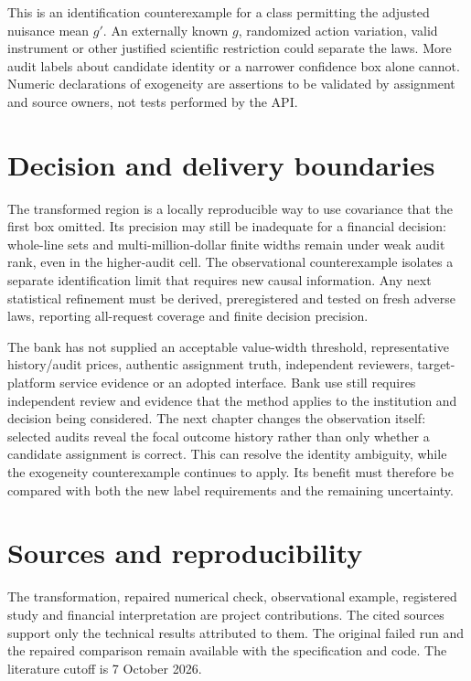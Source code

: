 This is an identification counterexample for a class permitting the adjusted
nuisance mean $g'$. An externally known $g$, randomized action variation,
valid instrument or other justified scientific restriction could separate
the laws. More audit labels about candidate identity or a narrower confidence
box alone cannot. Numeric declarations of exogeneity are assertions to be
validated by assignment and source owners, not tests performed by the API.

\section{Decision and delivery boundaries}

The transformed region is a locally reproducible way to use covariance that
the first box omitted. Its precision may still be inadequate for a financial decision: whole-line
sets and multi-million-dollar finite widths remain under weak audit rank,
even in the higher-audit cell. The observational counterexample isolates a separate identification limit that requires new causal information. Any next
statistical refinement must be derived, preregistered and tested on fresh
adverse laws, reporting all-request coverage and finite decision precision.

The bank has not supplied an acceptable value-width threshold, representative
history/audit prices, authentic assignment truth, independent reviewers,
target-platform service evidence or an adopted interface. Bank use still requires independent review and evidence that the
method applies to the institution and decision being considered. The next chapter changes the observation itself: selected audits reveal the focal outcome history rather than only whether a candidate assignment is correct. This can resolve the identity ambiguity, while the exogeneity counterexample continues to apply. Its benefit must therefore be compared with both the new label requirements and the remaining uncertainty.

\section*{Sources and reproducibility}

The transformation, repaired numerical check, observational example,
registered study and financial interpretation are project contributions.
The cited sources support only the technical results attributed to them.
The original failed run and the repaired comparison remain available with
the specification and code. The literature cutoff is 7 October 2026.

